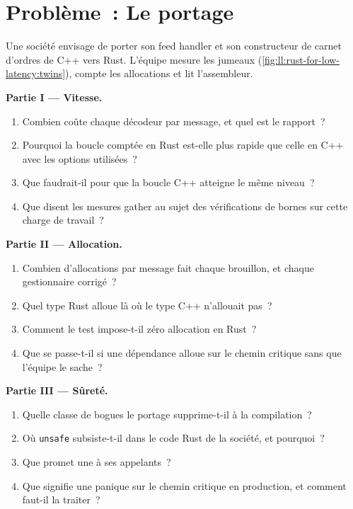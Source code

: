 \section{Problème~: Le portage}

\begin{problem}\label{pb:ll:rust-for-low-latency:1}
Une société envisage de porter son feed handler et son constructeur de carnet d'ordres de C++ vers Rust. L'équipe mesure les jumeaux
(\cref{fig:ll:rust-for-low-latency:twins}), compte les allocations et lit l'assembleur.

\medskip\noindent\textbf{Partie I --- Vitesse.}
\begin{enumerate}
\item Combien coûte chaque décodeur par message, et quel est le rapport~?
\item Pourquoi la boucle comptée en Rust est-elle plus rapide que celle en C++ avec les options utilisées~?
\item Que faudrait-il pour que la boucle C++ atteigne le même niveau~?
\item Que disent les mesures gather au sujet des vérifications de bornes sur cette charge de travail~?
\end{enumerate}

\medskip\noindent\textbf{Partie II --- Allocation.}
\begin{enumerate}[resume]
\item Combien d'allocations par message fait chaque brouillon, et chaque gestionnaire corrigé~?
\item Quel type Rust alloue là où le type C++ n'allouait pas~?
\item Comment le test impose-t-il zéro allocation en Rust~?
\item Que se passe-t-il si une dépendance alloue sur le chemin critique sans que l'équipe le sache~?
\end{enumerate}

\medskip\noindent\textbf{Partie III --- Sûreté.}
\begin{enumerate}[resume]
\item Quelle classe de bogues le portage supprime-t-il à la compilation~?
\item Où \texttt{unsafe} subsiste-t-il dans le code Rust de la société, et pourquoi~?
\item Que promet une  à ses appelants~?
\item Que signifie une panique sur le chemin critique en production, et comment faut-il la traiter~?
\end{enumerate}


\end{problem}
